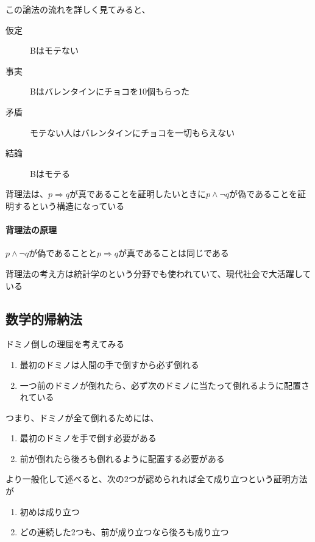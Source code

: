 \documentclass[../book_need-set-theory]{subfiles}
\begin{document}
この論法の流れを詳しく見てみると、

\begin{description}
  \item[仮定] Bはモテない
  \item[事実] Bはバレンタインにチョコを10個もらった
  \item[矛盾] モテない人はバレンタインにチョコを一切もらえない
  \item[結論] Bはモテる
\end{description}

背理法は、$p \Rightarrow q$が真であることを証明したいときに$p \land \neg q$が偽であることを証明するという構造になっている

\begin{oframed}
  \paragraph{背理法の原理}
  $p \land \neg q$が偽であることと$p \Rightarrow q$が真であることは同じである
\end{oframed}

\begin{leftbar}
\end{leftbar}

背理法の考え方は統計学のという分野でも使われていて、現代社会で大活躍している

\sectionline
\subsection{数学的帰納法}

ドミノ倒しの理屈を考えてみる

\begin{enumerate}
  \item 最初のドミノは人間の手で倒すから必ず倒れる
  \item 一つ前のドミノが倒れたら、必ず次のドミノに当たって倒れるように配置されている
\end{enumerate}

つまり、ドミノが全て倒れるためには、

\begin{enumerate}
  \item 最初のドミノを手で倒す必要がある
  \item 前が倒れたら後ろも倒れるように配置する必要がある
\end{enumerate}

より一般化して述べると、次の2つが認められれば全て成り立つという証明方法が

\begin{enumerate}
  \item 初めは成り立つ
  \item どの連続した2つも、前が成り立つなら後ろも成り立つ
\end{enumerate}
\end{document}
